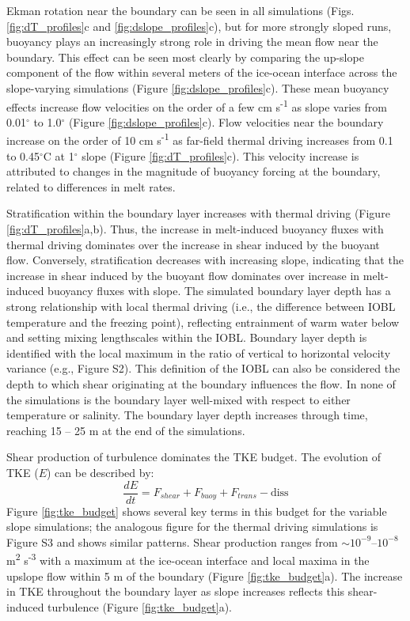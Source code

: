 \documentclass[draft]{agujournal2019}
\begin{document}
Ekman rotation near the boundary can be seen in all simulations (Figs. \ref{fig:dT_profiles}c and \ref{fig:dslope_profiles}c), but for more strongly sloped runs, buoyancy plays an increasingly strong role in driving the mean flow near the boundary. This effect can be seen most clearly by comparing the up-slope component of the flow within several meters of the ice-ocean interface across the slope-varying simulations (Figure \ref{fig:dslope_profiles}c). These mean buoyancy effects increase flow velocities on the order of a few cm s\textsuperscript{-1} as slope varies from 0.01$^{\circ}$ to 1.0$^{\circ}$ (Figure \ref{fig:dslope_profiles}c). Flow velocities near the boundary increase on the order of 10 cm s\textsuperscript{-1} as far-field thermal driving increases from 0.1 to 0.45$^{\circ}$C at 1$^{\circ}$ slope (Figure \ref{fig:dT_profiles}c). This velocity increase is attributed to changes in the magnitude of buoyancy forcing at the boundary, related to differences in melt rates. 

Stratification within the boundary layer increases with thermal driving (Figure \ref{fig:dT_profiles}a,b). Thus, the increase in melt-induced buoyancy fluxes with thermal driving dominates over the increase in shear induced by the buoyant flow. Conversely, stratification decreases with increasing slope, indicating that the increase in shear induced by the buoyant flow dominates over increase in melt-induced buoyancy fluxes with slope. The simulated boundary layer depth has a strong relationship with local thermal driving (i.e., the difference between IOBL temperature and the freezing point), reflecting entrainment of warm water below and setting mixing lengthscales  within the IOBL. Boundary layer depth is identified with the local maximum in the ratio of vertical to horizontal velocity variance (e.g., Figure S2). This definition of the IOBL can also be considered the depth to which shear originating at the boundary influences the flow. In none of the simulations is the boundary layer well-mixed with respect to either temperature or salinity. The boundary layer depth increases through time, reaching 15 -- 25 m at the end of the simulations. 

Shear production of turbulence dominates the TKE budget. The evolution of TKE ($E$) can be described by:
\begin{equation}
    \frac{dE}{dt} = F_{shear} + F_{buoy} + F_{trans} - \textrm{diss}
\end{equation}
Figure \ref{fig:tke_budget} shows several key terms in this budget for the variable slope simulations; the analogous figure for the thermal driving simulations is Figure S3 and shows similar patterns. Shear production ranges from $\sim 10^{-9} \textrm{--} 10^{-8}$ m\textsuperscript{2} s\textsuperscript{-3} with a maximum at the ice-ocean interface and local maxima in the upslope flow within 5 m of the boundary (Figure \ref{fig:tke_budget}a). The increase in TKE throughout the boundary layer as slope increases reflects this shear-induced turbulence (Figure \ref{fig:tke_budget}a).
\end{document}
